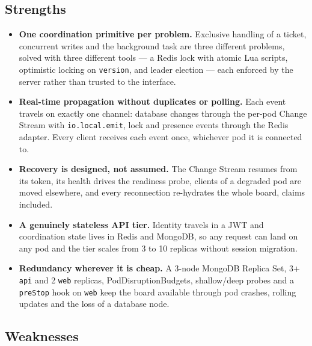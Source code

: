 \documentclass{scrartcl}
\begin{document}
\subsection{Strengths}

\begin{itemize}
  \item \textbf{One coordination primitive per problem.} Exclusive handling of a ticket, concurrent writes and the background task are three different problems, solved with three different tools --- a Redis lock with atomic Lua scripts, optimistic locking on \texttt{version}, and leader election --- each enforced by the server rather than trusted to the interface.
  \item \textbf{Real-time propagation without duplicates or polling.} Each event travels on exactly one channel: database changes through the per-pod Change Stream with \texttt{io.local.emit}, lock and presence events through the Redis adapter. Every client receives each event once, whichever pod it is connected to.
  \item \textbf{Recovery is designed, not assumed.} The Change Stream resumes from its token, its health drives the readiness probe, clients of a degraded pod are moved elsewhere, and every reconnection re-hydrates the whole board, claims included.
  \item \textbf{A genuinely stateless API tier.} Identity travels in a JWT and coordination state lives in Redis and MongoDB, so any request can land on any pod and the tier scales from 3 to 10 replicas without session migration.
  \item \textbf{Redundancy wherever it is cheap.} A 3-node MongoDB Replica Set, 3+ \texttt{api} and 2 \texttt{web} replicas, PodDisruptionBudgets, shallow/deep probes and a \texttt{preStop} hook on \texttt{web} keep the board available through pod crashes, rolling updates and the loss of a database node.
\end{itemize}

\subsection{Weaknesses}
\end{document}

